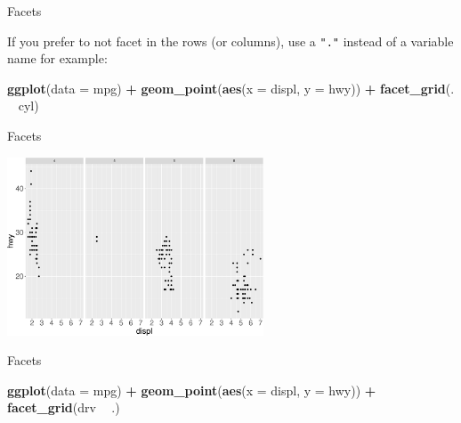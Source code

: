 \documentclass[ignorenonframetext,]{beamer}
\newenvironment{Shaded}{\begin{snugshade}}{\end{snugshade}}
\newcommand{\DataTypeTok}[1]{\textcolor[rgb]{0.13,0.29,0.53}{#1}}
\newcommand{\KeywordTok}[1]{\textcolor[rgb]{0.13,0.29,0.53}{\textbf{#1}}}
\newcommand{\NormalTok}[1]{#1}
\newcommand{\OperatorTok}[1]{\textcolor[rgb]{0.81,0.36,0.00}{\textbf{#1}}}
\newcommand{\StringTok}[1]{\textcolor[rgb]{0.31,0.60,0.02}{#1}}
\begin{document}
\begin{frame}[fragile]{Facets}
\protect\hypertarget{facets-7}{}

If you prefer to not facet in the rows (or columns), use a \texttt{"."}
instead of a variable name for example:

\begin{Shaded}
\begin{Highlighting}[]
\KeywordTok{ggplot}\NormalTok{(}\DataTypeTok{data =}\NormalTok{ mpg) }\OperatorTok{+}\StringTok{ }
\StringTok{  }\KeywordTok{geom_point}\NormalTok{(}\KeywordTok{aes}\NormalTok{(}\DataTypeTok{x =}\NormalTok{ displ, }\DataTypeTok{y =}\NormalTok{ hwy)) }\OperatorTok{+}\StringTok{ }
\StringTok{  }\KeywordTok{facet_grid}\NormalTok{(. }\OperatorTok{~}\StringTok{ }\NormalTok{cyl)}
\end{Highlighting}
\end{Shaded}

\end{frame}

\begin{frame}{Facets}
\protect\hypertarget{facets-8}{}

\begin{center}\includegraphics[height=200px]{data-visualization_files/figure-beamer/unnamed-chunk-77-1} \end{center}

\end{frame}

\begin{frame}[fragile]{Facets}
\protect\hypertarget{facets-9}{}

\begin{Shaded}
\begin{Highlighting}[]
\KeywordTok{ggplot}\NormalTok{(}\DataTypeTok{data =}\NormalTok{ mpg) }\OperatorTok{+}\StringTok{ }
\StringTok{  }\KeywordTok{geom_point}\NormalTok{(}\KeywordTok{aes}\NormalTok{(}\DataTypeTok{x =}\NormalTok{ displ, }\DataTypeTok{y =}\NormalTok{ hwy)) }\OperatorTok{+}
\StringTok{  }\KeywordTok{facet_grid}\NormalTok{(drv }\OperatorTok{~}\StringTok{ }\NormalTok{.)}
\end{Highlighting}
\end{Shaded}

\end{frame}
\end{document}
